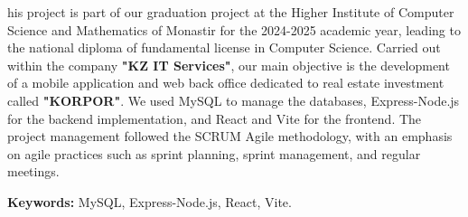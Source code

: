 \noindent {}his project is part of our graduation project at the Higher Institute of Computer Science and Mathematics of Monastir for the 2024-2025 academic year, leading to the national diploma of fundamental license in Computer Science.
Carried out within the company \textbf{\textcolor{primary}{"KZ IT Services"}}, our main objective is the development of a mobile application and web back office dedicated to real estate investment called \textbf{\textcolor{primary}{"KORPOR"}}. We used MySQL to manage the databases, Express-Node.js for the backend implementation, and React and Vite for the frontend.
The project management followed the SCRUM Agile methodology, with an emphasis on agile practices such as sprint planning, sprint management, and regular meetings.

\vspace{0.3cm}
\begin{tcolorbox}[
    colback=background,
    colframe=primary,
    arc=1mm,
    boxrule=0.5pt,
    left=8pt,
    right=8pt,
    top=4pt,
    bottom=4pt,
    width=\textwidth
]
\textbf{Keywords:} MySQL, Express-Node.js, React, Vite.
\end{tcolorbox}

\nopagebreak 